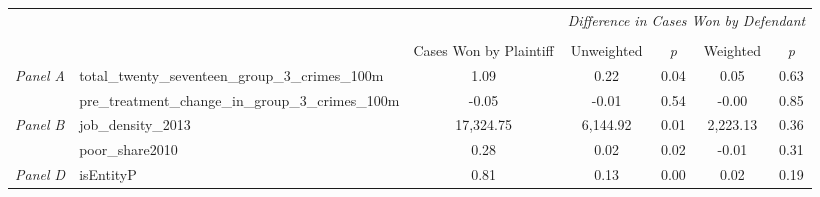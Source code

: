 \begin{tabular}{llccccc}
\toprule
 &  & \textit{} & \multicolumn{4}{c}{\textit{Difference in Cases Won by Defendant}} \\
\cline{4-7}
\\
 &  & Cases Won by Plaintiff & Unweighted & \emph{p} & Weighted & \emph{p} \\
\midrule
\multirow[c]{2}{3cm}{\textit{Panel A}} & total_twenty_seventeen_group_3_crimes_100m & 1.09 & 0.22 & 0.04 & 0.05 & 0.63 \\
 & pre_treatment_change_in_group_3_crimes_100m & -0.05 & -0.01 & 0.54 & -0.00 & 0.85 \\
\cline{1-7}
\multirow[c]{2}{3cm}{\textit{Panel B}} & job_density_2013 & 17,324.75 & 6,144.92 & 0.01 & 2,223.13 & 0.36 \\
 & poor_share2010 & 0.28 & 0.02 & 0.02 & -0.01 & 0.31 \\
\cline{1-7}
\textit{Panel D} & isEntityP & 0.81 & 0.13 & 0.00 & 0.02 & 0.19 \\
\cline{1-7}
\bottomrule
\end{tabular}
